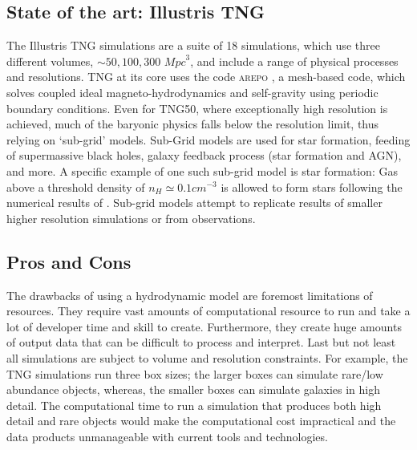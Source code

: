 \subsection{State of the art: Illustris TNG}
The Illustris TNG simulations are a suite of 18 simulations, which use three different volumes, $\sim 50, 100, 300$ ${Mpc}^{3}$, and include a range of physical processes and resolutions. TNG at its core uses the code \textsc{arepo} \citep{Springel2010EMesh}, a mesh-based code, which solves coupled ideal magneto-hydrodynamics and self-gravity using periodic boundary conditions. Even for TNG50, where exceptionally high resolution is achieved, much of the baryonic physics falls below the resolution limit, thus relying on `sub-grid' models. Sub-Grid models are used for star formation, feeding of supermassive black holes, galaxy feedback process (star formation and AGN), and more. A specific example of one such sub-grid model is star formation: Gas above a threshold density of $n_H \simeq 0.1cm^{-3}$ is allowed to form stars following the numerical results of \citet{Springel2003CosmologicalFormation}. Sub-grid models attempt to replicate results of smaller higher resolution simulations or from observations. 

\subsection{Pros and Cons}
The drawbacks of using a hydrodynamic model are foremost limitations of resources. They require vast amounts of computational resource to run and take a lot of developer time and skill to create. Furthermore, they create huge amounts of output data that can be difficult to process and interpret. Last but not least all simulations are subject to volume and resolution constraints. For example, the TNG simulations run three box sizes; the larger boxes can simulate rare/low abundance objects, whereas, the smaller boxes can simulate galaxies in high detail. The computational time to run a simulation that produces both high detail and rare objects would make the computational cost impractical and the data products unmanageable with current tools and technologies. 

